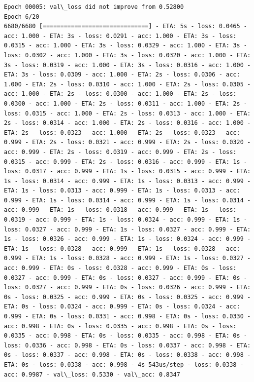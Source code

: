 \documentclass[11pt]{article}
\begin{document}
\begin{Verbatim}[commandchars=\\\{\}]
Epoch 00005: val\_loss did not improve from 0.52800
Epoch 6/20
6680/6680 [==============================] - ETA: 5s - loss: 0.0465 - acc: 1.000 - ETA: 3s - loss: 0.0291 - acc: 1.000 - ETA: 3s - loss: 0.0315 - acc: 1.000 - ETA: 3s - loss: 0.0329 - acc: 1.000 - ETA: 3s - loss: 0.0302 - acc: 1.000 - ETA: 3s - loss: 0.0320 - acc: 1.000 - ETA: 3s - loss: 0.0319 - acc: 1.000 - ETA: 3s - loss: 0.0316 - acc: 1.000 - ETA: 3s - loss: 0.0309 - acc: 1.000 - ETA: 2s - loss: 0.0306 - acc: 1.000 - ETA: 2s - loss: 0.0310 - acc: 1.000 - ETA: 2s - loss: 0.0305 - acc: 1.000 - ETA: 2s - loss: 0.0300 - acc: 1.000 - ETA: 2s - loss: 0.0300 - acc: 1.000 - ETA: 2s - loss: 0.0311 - acc: 1.000 - ETA: 2s - loss: 0.0315 - acc: 1.000 - ETA: 2s - loss: 0.0313 - acc: 1.000 - ETA: 2s - loss: 0.0314 - acc: 1.000 - ETA: 2s - loss: 0.0316 - acc: 1.000 - ETA: 2s - loss: 0.0323 - acc: 1.000 - ETA: 2s - loss: 0.0323 - acc: 0.999 - ETA: 2s - loss: 0.0321 - acc: 0.999 - ETA: 2s - loss: 0.0320 - acc: 0.999 - ETA: 2s - loss: 0.0319 - acc: 0.999 - ETA: 2s - loss: 0.0315 - acc: 0.999 - ETA: 2s - loss: 0.0316 - acc: 0.999 - ETA: 1s - loss: 0.0317 - acc: 0.999 - ETA: 1s - loss: 0.0315 - acc: 0.999 - ETA: 1s - loss: 0.0314 - acc: 0.999 - ETA: 1s - loss: 0.0313 - acc: 0.999 - ETA: 1s - loss: 0.0313 - acc: 0.999 - ETA: 1s - loss: 0.0313 - acc: 0.999 - ETA: 1s - loss: 0.0314 - acc: 0.999 - ETA: 1s - loss: 0.0314 - acc: 0.999 - ETA: 1s - loss: 0.0318 - acc: 0.999 - ETA: 1s - loss: 0.0319 - acc: 0.999 - ETA: 1s - loss: 0.0324 - acc: 0.999 - ETA: 1s - loss: 0.0327 - acc: 0.999 - ETA: 1s - loss: 0.0327 - acc: 0.999 - ETA: 1s - loss: 0.0326 - acc: 0.999 - ETA: 1s - loss: 0.0324 - acc: 0.999 - ETA: 1s - loss: 0.0328 - acc: 0.999 - ETA: 1s - loss: 0.0328 - acc: 0.999 - ETA: 1s - loss: 0.0328 - acc: 0.999 - ETA: 1s - loss: 0.0327 - acc: 0.999 - ETA: 0s - loss: 0.0328 - acc: 0.999 - ETA: 0s - loss: 0.0327 - acc: 0.999 - ETA: 0s - loss: 0.0327 - acc: 0.999 - ETA: 0s - loss: 0.0327 - acc: 0.999 - ETA: 0s - loss: 0.0326 - acc: 0.999 - ETA: 0s - loss: 0.0325 - acc: 0.999 - ETA: 0s - loss: 0.0325 - acc: 0.999 - ETA: 0s - loss: 0.0324 - acc: 0.999 - ETA: 0s - loss: 0.0324 - acc: 0.999 - ETA: 0s - loss: 0.0331 - acc: 0.998 - ETA: 0s - loss: 0.0330 - acc: 0.998 - ETA: 0s - loss: 0.0335 - acc: 0.998 - ETA: 0s - loss: 0.0335 - acc: 0.998 - ETA: 0s - loss: 0.0335 - acc: 0.998 - ETA: 0s - loss: 0.0336 - acc: 0.998 - ETA: 0s - loss: 0.0337 - acc: 0.998 - ETA: 0s - loss: 0.0337 - acc: 0.998 - ETA: 0s - loss: 0.0338 - acc: 0.998 - ETA: 0s - loss: 0.0338 - acc: 0.998 - 4s 543us/step - loss: 0.0338 - acc: 0.9987 - val\_loss: 0.5330 - val\_acc: 0.8347


\end{Verbatim}
\end{document}

